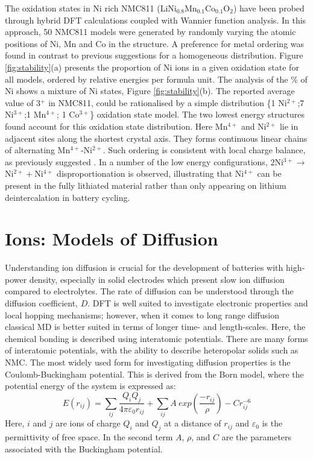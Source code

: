 \documentclass[aps,prb,twocolumn,superscriptaddress,reprint]{revtex4-1}
\begin{document}
The oxidation states in Ni rich NMC811 (LiNi$_{0.8}$Mn$_{0.1}$Co$_{0.1}$O$_{2}$) have been probed through hybrid DFT calculations coupled with Wannier function analysis\cite{rana}. 
In this approach, 50 NMC811 models were generated by randomly varying the atomic positions of Ni, Mn and Co in the structure.
A preference for metal ordering was found in contrast to previous suggestions for a homogeneous distribution.\cite{Sun_JPhysChemC2017} 
Figure \ref{fig:stability}(a) presents the proportion of Ni ions in a given oxidation state for all models, ordered by relative energies per formula unit. 
The analysis of the \% of Ni shows a mixture of Ni states, Figure \ref{fig:stability}(b). 
The reported average value of 3$^+$ in NMC811,\cite{Zhu_JMatChemA2019,Kondrakov_JPhysChemC2017} could be rationalised by a simple distribution \{1 Ni$^{2+}$;7 Ni$^{3+}$;1 Mn$^{4+}$; 1 Co$^{3+}$\} oxidation state model. 
The two lowest energy structures found account for this oxidation state distribution. 
Here Mn$^{4+}$ and Ni$^{2+}$ lie in adjacent sites along the shortest crystal axis. They forms continuous linear chains of alternating Mn$^{4+}$-Ni$^{2+}$. 
Such ordering is consistent with local charge balance, as previously suggested \cite{Zeng_ChemMater2007}. 
In a number of the low energy configurations, $2$Ni$^{3+}\rightarrow$Ni$^{2+} + $Ni$^{4+}$ disproportionation is  observed, illustrating that Ni$^{4+}$ can be present in the fully lithiated material rather than only appearing on lithium deintercalation in battery cycling.



\section*{Ions: Models of Diffusion}
Understanding ion diffusion is crucial for the development of batteries with high‐power density, especially in solid electrodes which present slow ion diffusion compared to electrolytes. 
The rate of diffusion can be understood through the diffusion coefficient, $D$. 
DFT is well suited to investigate electronic properties and local hopping mechanisms;\cite{van_der_ven_layered_2001, van_der_ven_LiTiS2_2008} however, when it comes to long range diffusion classical MD is better suited in terms of longer time- and length-scales. 
Here, the chemical bonding is described using interatomic potentials. 
There are many forms of interatomic potentials, with the ability to describe heteropolar solids such as NMC. 
The most widely used form for investigating diffusion properties is the Coulomb-Buckingham potential. \cite{buckingham_classical_1938} 
This is derived from the Born model\cite{born_1932, mayer_1932}, where the potential energy of the system is expressed as:
%
\begin{equation}
    E(r_{ij}) =  \sum_{ij} \frac{Q_i Q_j}{4\pi \varepsilon_0 r_{ij}} + \sum_{ij} A \ exp(\frac{-r_{ij}}{\rho}) - Cr_{ij}^{-6}
\end{equation}
%
Here, $i$ and $j$ are ions of charge $Q_i$ and $Q_j$ at a distance of $r_{ij}$ and $\varepsilon_0$ is the permittivity of free space. In the second term $A$, $\rho$, and $C$ are the parameters associated with the Buckingham potential.
\end{document}
